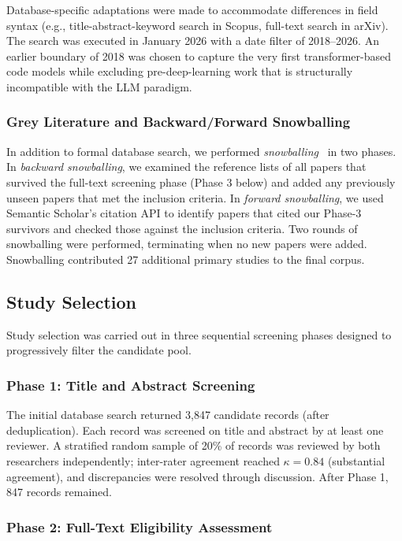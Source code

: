 Database-specific adaptations were made to accommodate differences in field syntax (e.g.,
title-abstract-keyword search in Scopus, full-text search in arXiv). The search was executed
in January 2026 with a date filter of 2018--2026. An earlier boundary of 2018 was chosen to
capture the very first transformer-based code models while excluding pre-deep-learning work
that is structurally incompatible with the LLM paradigm.

\subsubsection{Grey Literature and Backward/Forward Snowballing}

In addition to formal database search, we performed \emph{snowballing}~\cite{wohlin2014snowballing}
in two phases. In \emph{backward snowballing}, we examined the reference lists of all papers
that survived the full-text screening phase (Phase 3 below) and added any previously unseen
papers that met the inclusion criteria. In \emph{forward snowballing}, we used Semantic Scholar's
citation API to identify papers that cited our Phase-3 survivors and checked those against the
inclusion criteria. Two rounds of snowballing were performed, terminating when no new papers
were added. Snowballing contributed 27 additional primary studies to the final corpus.

\subsection{Study Selection}
\label{subsec:selection}

Study selection was carried out in three sequential screening phases designed to progressively
filter the candidate pool.

\subsubsection{Phase 1: Title and Abstract Screening}

The initial database search returned 3,847 candidate records (after deduplication). Each record
was screened on title and abstract by at least one reviewer. A stratified random sample of 20\%
of records was reviewed by both researchers independently; inter-rater agreement reached
$\kappa = 0.84$ (substantial agreement), and discrepancies were resolved through discussion.
After Phase 1, 847 records remained.

\subsubsection{Phase 2: Full-Text Eligibility Assessment}

